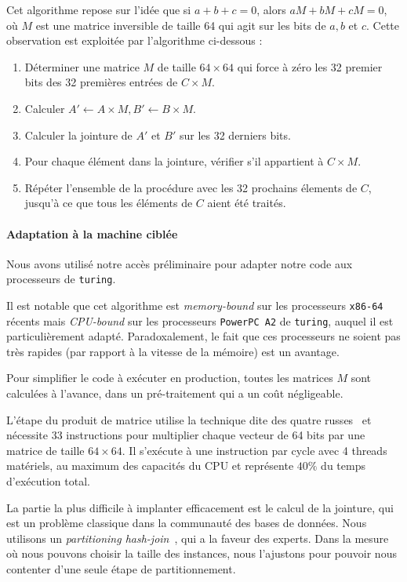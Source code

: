 \documentclass[
    a4paper, 
    12pt, onecolumn,
]{article}
\begin{document}
Cet algorithme repose sur l'idée que si $a + b + c = 0$, alors
$aM + bM + cM = 0$, où $M$ est une matrice inversible de taille 64 qui agit sur
les bits de $a,b$ et $c$. Cette observation est exploitée par l'algorithme
ci-dessous :
\begin{enumerate}
\item Déterminer une matrice $M$ de taille $64 \times 64$ qui force à zéro les
  32 premier bits des 32 premières entrées de $C \times M$.
\item Calculer $A' \gets A \times M, B' \gets B \times M$.
\item Calculer la jointure de $A'$ et $B'$ sur les 32 derniers bits.
\item Pour chaque élément dans la jointure, vérifier s'il appartient à $C \times M$.
\item Répéter l'ensemble de la procédure avec les 32 prochains élements de $C$,
  jusqu'à ce que tous les éléments de $C$ aient été traités.
\end{enumerate}

\paragraph{Adaptation à la machine ciblée}

Nous avons utilisé notre accès préliminaire pour adapter notre code aux
processeurs de \texttt{turing}.

Il est notable que cet algorithme est \emph{memory-bound} sur les processeurs
\texttt{x86-64} récents mais \emph{CPU-bound} sur les processeurs
\texttt{PowerPC A2} de \texttt{turing}, auquel il est particulièrement
adapté. Paradoxalement, le fait que ces processeurs ne soient pas très rapides
(par rapport à la vitesse de la mémoire) est un avantage.

Pour simplifier le code à exécuter \og en production\fg{}, toutes les matrices
$M$ sont calculées à l'avance, dans un pré-traitement qui a un coût négligeable.

L'étape du produit de matrice utilise la technique dite des \og quatre
russes\fg~\cite{4russians} et nécessite 33 instructions pour multiplier chaque
vecteur de 64 bits par une matrice de taille $64 \times 64$. Il s'exécute à une
instruction par cycle avec 4 threads matériels, au maximum des capacités du CPU
et représente $40\%$ du temps d'exécution total.

La partie la plus difficile à implanter efficacement est le calcul de la
jointure, qui est un problème classique dans la communauté des bases de
données. Nous utilisons un \og \emph{partitioning
  hash-join}~\cite{BalkesenATO13}, qui a la faveur des experts. Dans la mesure
où nous pouvons choisir la taille des instances, nous l'ajustons pour pouvoir
nous contenter d'une seule étape de partitionnement.
\end{document}
